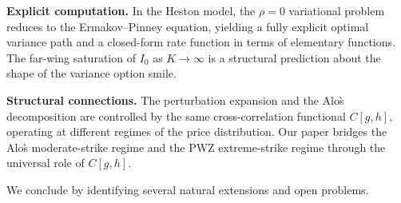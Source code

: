 \documentclass[11pt]{article}
\theoremstyle{definition}
\begin{document}
\textbf{Explicit computation.} In the Heston model, the $\rho = 0$ variational problem reduces to the Ermakov--Pinney equation, yielding a fully explicit optimal variance path and a closed-form rate function in terms of elementary functions. The far-wing saturation of $I_0$ as $K \to \infty$ is a structural prediction about the shape of the variance option smile.

\textbf{Structural connections.} The perturbation expansion and the Alo\`s decomposition are controlled by the same cross-correlation functional $C[g,h]$, operating at different regimes of the price distribution. Our paper bridges the Alo\`s moderate-strike regime and the PWZ extreme-strike regime through the universal role of $C[g,h]$.

We conclude by identifying several natural extensions and open problems.
\end{document}
